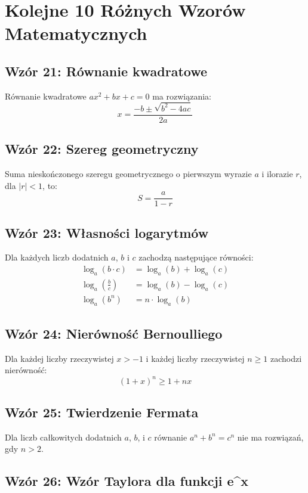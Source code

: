 \documentclass{article}
\begin{document}
\section*{Kolejne 10 Różnych Wzorów Matematycznych}

\subsection*{Wzór 21: Równanie kwadratowe}

Równanie kwadratowe \(ax^2 + bx + c = 0\) ma rozwiązania:
\[ x = \frac{-b \pm \sqrt{b^2-4ac}}{2a} \]

\subsection*{Wzór 22: Szereg geometryczny}

Suma nieskończonego szeregu geometrycznego o pierwszym wyrazie \(a\) i ilorazie \(r\), dla \(|r| < 1\), to:
\[ S = \frac{a}{1-r} \]

\subsection*{Wzór 23: Własności logarytmów}

Dla każdych liczb dodatnich \(a\), \(b\) i \(c\) zachodzą następujące równości:
\begin{align*}
\log_a(b \cdot c) &= \log_a(b) + \log_a(c) \\
\log_a\left(\frac{b}{c}\right) &= \log_a(b) - \log_a(c) \\
\log_a(b^n) &= n \cdot \log_a(b)
\end{align*}

\subsection*{Wzór 24: Nierówność Bernoulliego}

Dla każdej liczby rzeczywistej \(x > -1\) i każdej liczby rzeczywistej \(n \geq 1\) zachodzi nierówność:
\[ (1 + x)^n \geq 1 + nx \]

\subsection*{Wzór 25: Twierdzenie Fermata}

Dla liczb całkowitych dodatnich \(a\), \(b\), i \(c\) równanie \(a^n + b^n = c^n\) nie ma rozwiązań, gdy \(n > 2\).

\subsection*{Wzór 26: Wzór Taylora dla funkcji e^x}
\end{document}
